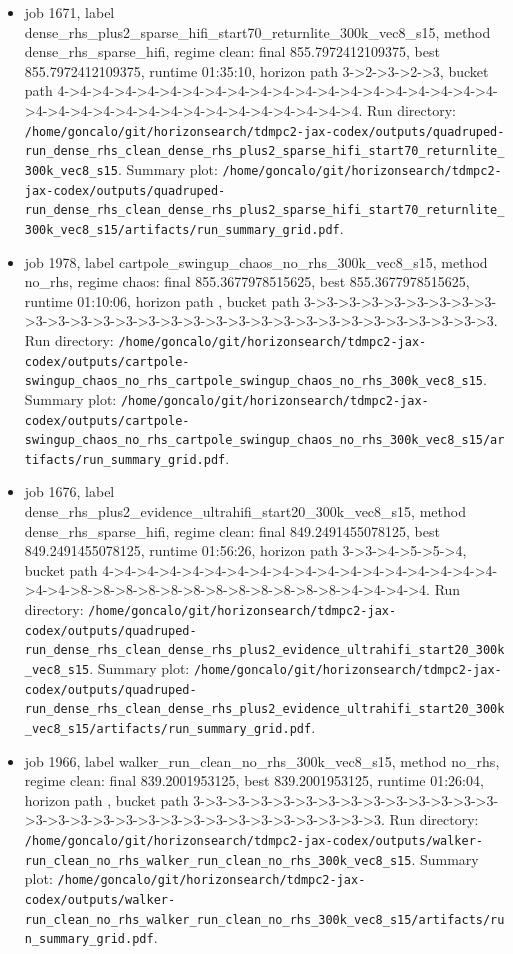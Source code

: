 \begin{itemize}
\item job 1671, label dense\_rhs\_plus2\_sparse\_hifi\_start70\_returnlite\_300k\_vec8\_s15, method dense\_rhs\_sparse\_hifi, regime clean: final 855.7972412109375, best 855.7972412109375, runtime 01:35:10, horizon path 3->2->3->2->3, bucket path 4->4->4->4->4->4->4->4->4->4->4->4->4->4->4->4->4->4->4->4->4->4->4->4->4->4->4->4->4->4->4->4->4->4->4. Run directory: \texttt{/home/goncalo/git/horizonsearch/tdmpc2-jax-codex/outputs/quadruped-run\_dense\_rhs\_clean\_dense\_rhs\_plus2\_sparse\_hifi\_start70\_returnlite\_300k\_vec8\_s15}. Summary plot: \texttt{/home/goncalo/git/horizonsearch/tdmpc2-jax-codex/outputs/quadruped-run\_dense\_rhs\_clean\_dense\_rhs\_plus2\_sparse\_hifi\_start70\_returnlite\_300k\_vec8\_s15/artifacts/run\_summary\_grid.pdf}.
\item job 1978, label cartpole\_swingup\_chaos\_no\_rhs\_300k\_vec8\_s15, method no\_rhs, regime chaos: final 855.3677978515625, best 855.3677978515625, runtime 01:10:06, horizon path , bucket path 3->3->3->3->3->3->3->3->3->3->3->3->3->3->3->3->3->3->3->3->3->3->3->3->3->3->3->3->3->3. Run directory: \texttt{/home/goncalo/git/horizonsearch/tdmpc2-jax-codex/outputs/cartpole-swingup\_chaos\_no\_rhs\_cartpole\_swingup\_chaos\_no\_rhs\_300k\_vec8\_s15}. Summary plot: \texttt{/home/goncalo/git/horizonsearch/tdmpc2-jax-codex/outputs/cartpole-swingup\_chaos\_no\_rhs\_cartpole\_swingup\_chaos\_no\_rhs\_300k\_vec8\_s15/artifacts/run\_summary\_grid.pdf}.
\item job 1676, label dense\_rhs\_plus2\_evidence\_ultrahifi\_start20\_300k\_vec8\_s15, method dense\_rhs\_sparse\_hifi, regime clean: final 849.2491455078125, best 849.2491455078125, runtime 01:56:26, horizon path 3->3->4->5->5->4, bucket path 4->4->4->4->4->4->4->4->4->4->4->4->4->4->4->4->4->4->4->4->8->8->8->8->8->8->8->8->8->8->8->8->4->4->4->4. Run directory: \texttt{/home/goncalo/git/horizonsearch/tdmpc2-jax-codex/outputs/quadruped-run\_dense\_rhs\_clean\_dense\_rhs\_plus2\_evidence\_ultrahifi\_start20\_300k\_vec8\_s15}. Summary plot: \texttt{/home/goncalo/git/horizonsearch/tdmpc2-jax-codex/outputs/quadruped-run\_dense\_rhs\_clean\_dense\_rhs\_plus2\_evidence\_ultrahifi\_start20\_300k\_vec8\_s15/artifacts/run\_summary\_grid.pdf}.
\item job 1966, label walker\_run\_clean\_no\_rhs\_300k\_vec8\_s15, method no\_rhs, regime clean: final 839.2001953125, best 839.2001953125, runtime 01:26:04, horizon path , bucket path 3->3->3->3->3->3->3->3->3->3->3->3->3->3->3->3->3->3->3->3->3->3->3->3->3->3->3->3->3->3. Run directory: \texttt{/home/goncalo/git/horizonsearch/tdmpc2-jax-codex/outputs/walker-run\_clean\_no\_rhs\_walker\_run\_clean\_no\_rhs\_300k\_vec8\_s15}. Summary plot: \texttt{/home/goncalo/git/horizonsearch/tdmpc2-jax-codex/outputs/walker-run\_clean\_no\_rhs\_walker\_run\_clean\_no\_rhs\_300k\_vec8\_s15/artifacts/run\_summary\_grid.pdf}.

\end{itemize}
